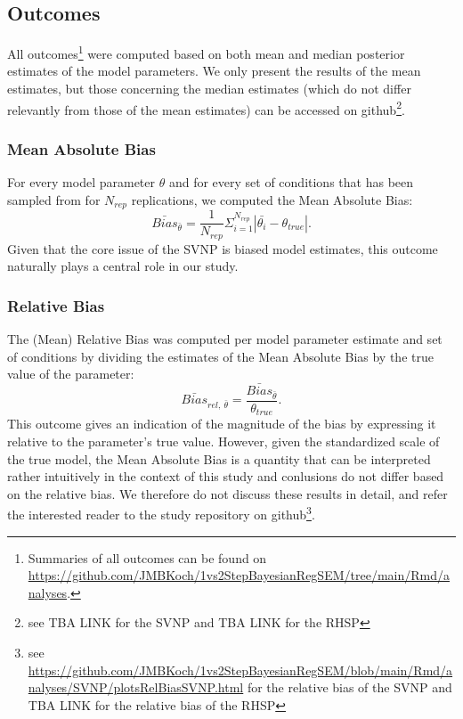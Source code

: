 \documentclass[
  man, donotrepeattitle,floatsintext]{apa6}
\begin{document}
\hypertarget{outcomes}{%
\subsection{Outcomes}\label{outcomes}}

All outcomes\footnote{Summaries of all outcomes can be found on \url{https://github.com/JMBKoch/1vs2StepBayesianRegSEM/tree/main/Rmd/analyses}.} were computed based on both mean and median posterior estimates of the model parameters. We only present the results of the mean estimates, but those concerning the median estimates (which do not differ relevantly from those of the mean estimates) can be accessed on github\footnote{see TBA LINK for the SVNP and TBA LINK for the RHSP}.

\hypertarget{mean-absolute-bias}{%
\subsubsection{Mean Absolute Bias}\label{mean-absolute-bias}}

For every model parameter \(\theta\) and for every set of conditions that has been sampled from for \(N_{rep}\) replications, we computed the Mean Absolute Bias:
\[\bar{Bias}_{\bar{\theta}} = \frac{1}{N_{rep}} \Sigma_{i = 1}^{N_{rep}} |\bar{\theta_i} - \theta_{true}|.\]
Given that the core issue of the SVNP is biased model estimates, this outcome naturally plays a central role in our study.

\hypertarget{relative-bias}{%
\subsubsection{Relative Bias}\label{relative-bias}}

The (Mean) Relative Bias was computed per model parameter estimate and set of conditions by dividing the estimates of the Mean Absolute Bias by the true value of the parameter:
\[\bar{Bias}_{rel, \ \bar{\theta} } = \frac{\bar{Bias}_{\bar{\theta}}}{\theta_{true} }.\]
This outcome gives an indication of the magnitude of the bias by expressing it relative to the parameter's true value. However, given the standardized scale of the true model, the Mean Absolute Bias is a quantity that can be interpreted rather intuitively in the context of this study and conlusions do not differ based on the relative bias. We therefore do not discuss these results in detail, and refer the interested reader to the study repository on github\footnote{see \url{https://github.com/JMBKoch/1vs2StepBayesianRegSEM/blob/main/Rmd/analyses/SVNP/plotsRelBiasSVNP.html} for the relative bias of the SVNP and TBA LINK for the relative bias of the RHSP}.
\end{document}
